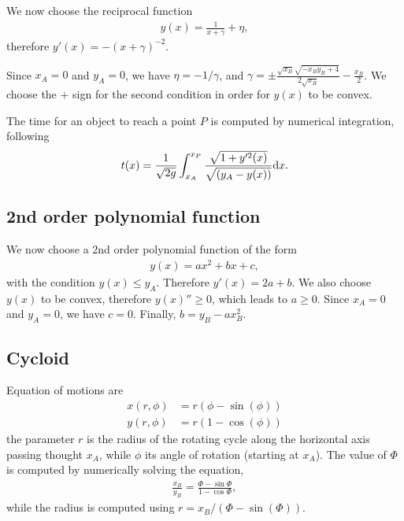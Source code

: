 \documentclass{article}
\begin{document}
We now choose the reciprocal function
\begin{align}
y(x) = \frac1{x+\gamma} + \eta,
\end{align}
therefore $y'(x) = -(x+\gamma)^{-2}$.

Since $x_A = 0$ and $y_A=0$, we have $\eta = -1/\gamma$, and $\displaystyle \gamma = \pm\frac{\sqrt{x_B} \sqrt{- x_B y_B + 4}}{2\sqrt{x_B}} - \frac{x_B}2$. We choose the $+$ sign for the second condition in order for $y(x)$ to be convex.

The time for an object to reach a point $P$ is computed by numerical integration, following
\begin{align}
t(x) &= \frac 1{\sqrt{2 g}} \int_{x_A}^{x_P} \frac{\sqrt{1 + y'^2(x)}}{\sqrt{(y_A - y(x))}} \text d x.\\
\label{eq:tAP_reciprocal}
\end{align}

\subsection*{2nd order polynomial function}

We now choose a 2nd order polynomial function of the form
\begin{align}
y(x) = a x^2 + b x + c,
\end{align}
with the condition $y(x) \leq y_A$. Therefore $y'(x) = 2a + b$. We also choose $y(x)$ to be convex, therefore $y(x)'' \geq 0$, which leads to $a \geq 0$. Since $x_A = 0$ and $y_A=0$, we have $c=0$. Finally, $b = y_B - a x_B^2$.


\subsection*{Cycloid}

Equation of motions are
\begin{align}
  x(r, \phi) &= r(\phi - \sin(\phi))\\
  y(r, \phi) &= r(1 - \cos(\phi))
\end{align}
the parameter $r$ is the radius of the rotating cycle along the horizontal axis passing thought $x_A$, while $\phi$ its angle of rotation (starting at $x_A$). The value of $\Phi$ is computed by numerically solving the equation,
\begin{align}
  \frac{x_B}{y_B} = \frac{\Phi - \sin{\Phi}}{1 - \cos{\Phi}},
\end{align}
while the radius is computed using $r=x_B/(\Phi - \sin(\Phi))$.
\end{document}

